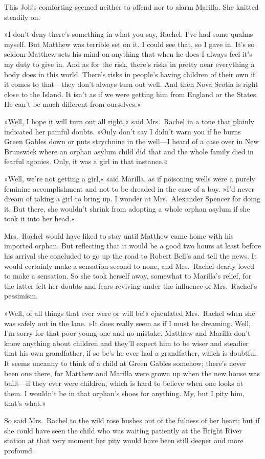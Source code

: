 This Job's comforting seemed neither to offend nor to alarm Marilla. She knitted steadily on.

»I don't deny there's something in what you say, Rachel. I've had some qualms myself. But Matthew was terrible set on it. I could see that, so I gave in. It's so seldom Matthew sets his mind on anything that when he does I always feel it's my duty to give in. And as for the risk, there's risks in pretty near everything a body does in this world. There's risks in people's having children of their own if it comes to that—they don't always turn out well. And then Nova Scotia is right close to the Island. It isn't as if we were getting him from England or the States. He can't be much different from ourselves.«

»Well, I hope it will turn out all right,« said Mrs.~Rachel in a tone that plainly indicated her painful doubts. »Only don't say I didn't warn you if he burns Green Gables down or puts strychnine in the well—I heard of a case over in New Brunswick where an orphan asylum child did that and the whole family died in fearful agonies. Only, it was a girl in that instance.«

»Well, we're not getting a girl,« said Marilla, as if poisoning wells were a purely feminine accomplishment and not to be dreaded in the case of a boy. »I'd never dream of taking a girl to bring up. I wonder at Mrs.~Alexander Spencer for doing it. But there, she wouldn't shrink from adopting a whole orphan asylum if she took it into her head.«

Mrs.~Rachel would have liked to stay until Matthew came home with his imported orphan. But reflecting that it would be a good two hours at least before his arrival she concluded to go up the road to Robert Bell's and tell the news. It would certainly make a sensation second to none, and Mrs.~Rachel dearly loved to make a sensation. So she took herself away, somewhat to Marilla's relief, for the latter felt her doubts and fears reviving under the influence of Mrs.~Rachel's pessimism.

»Well, of all things that ever were or will be!« ejaculated Mrs.~Rachel when she was safely out in the lane. »It does really seem as if I must be dreaming. Well, I'm sorry for that poor young one and no mistake. Matthew and Marilla don't know anything about children and they'll expect him to be wiser and steadier that his own grandfather, if so be's he ever had a grandfather, which is doubtful. It seems uncanny to think of a child at Green Gables somehow; there's never been one there, for Matthew and Marilla were grown up when the new house was built—if they ever were children, which is hard to believe when one looks at them. I wouldn't be in that orphan's shoes for anything. My, but I pity him, that's what.«

So said Mrs.~Rachel to the wild rose bushes out of the fulness of her heart; but if she could have seen the child who was waiting patiently at the Bright River station at that very moment her pity would have been still deeper and more profound.